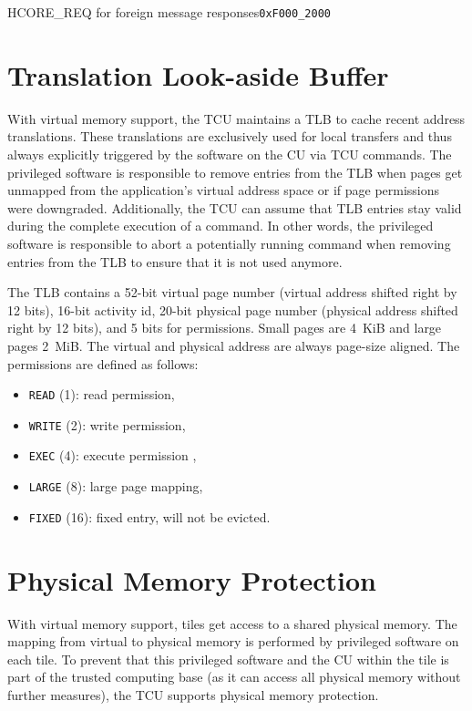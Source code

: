 \begin{register}{H}{CORE\_REQ for foreign message responses}{\texttt{0xF000\_2000}}
  \regnewline%
\end{register}
\extend{}

\section{Translation Look-aside Buffer}
\label{sec:tlb}

With virtual memory support, the TCU maintains a TLB to cache recent address translations. These
translations are exclusively used for local transfers and thus always explicitly triggered by the
software on the CU via TCU commands. The privileged software is responsible to remove entries from
the TLB when pages get unmapped from the application's virtual address space or if page permissions
were downgraded. Additionally, the TCU can assume that TLB entries stay valid during the complete
execution of a command. In other words, the privileged software is responsible to abort a
potentially running command when removing entries from the TLB to ensure that it is not used
anymore.

The TLB contains a 52-bit virtual page number (virtual address shifted right by 12 bits),
\colorbox{tilemux}{16-bit activity id, }20-bit physical page number (physical address shifted right by 12
bits), and 5 bits for permissions. Small pages are 4~KiB and large pages 2~MiB. The virtual and
physical address are always page-size aligned. The permissions are defined as follows:

\begin{itemize}
  \item \texttt{READ} (1): read permission,
  \item \texttt{WRITE} (2): write permission,
  \item \texttt{EXEC} (4): execute permission ,
  \item \texttt{LARGE} (8): large page mapping,
  \item \texttt{FIXED} (16): fixed entry, will not be evicted.
\end{itemize}

\section{Physical Memory Protection}

\noindent With virtual memory support, tiles get access to a shared physical memory. The mapping from
virtual to physical memory is performed by privileged software on each tile. To prevent that this
privileged software and the CU within the tile is part of the trusted computing base (as it can access
all physical memory without further measures), the TCU supports physical memory protection.

